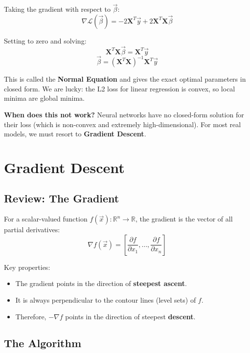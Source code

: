 \documentclass[12pt]{article}
\begin{document}
Taking the gradient with respect to $\vec{\beta}$:
\[
\nabla\mathcal{L}(\vec{\beta}) = -2\boldsymbol{X}^T\vec{y} + 2\boldsymbol{X}^T\boldsymbol{X}\vec{\beta}
\]

Setting to zero and solving:
\[
\boldsymbol{X}^T\boldsymbol{X}\vec{\beta} = \boldsymbol{X}^T\vec{y}
\]
\[
\boxed{\vec{\beta} = (\boldsymbol{X}^T\boldsymbol{X})^{-1}\boldsymbol{X}^T\vec{y}}
\]

This is called the \textbf{Normal Equation} and gives the exact optimal parameters in closed form. We are lucky: the L2 loss for linear regression is convex, so local minima are global minima.

\begin{notebox}
\textbf{When does this not work?} Neural networks have no closed-form solution for their loss (which is non-convex and extremely high-dimensional). For most real models, we must resort to \textbf{Gradient Descent}.
\end{notebox}

\section{Gradient Descent}

\subsection{Review: The Gradient}

For a scalar-valued function $f(\vec{x}) : \mathbb{R}^n \to \mathbb{R}$, the gradient is the vector of all partial derivatives:
\[
\nabla f(\vec{x}) = \left[\frac{\partial f}{\partial x_1}, \ldots, \frac{\partial f}{\partial x_n}\right]
\]

Key properties:
\begin{itemize}
  \item The gradient points in the direction of \textbf{steepest ascent}.
  \item It is always perpendicular to the contour lines (level sets) of $f$.
  \item Therefore, $-\nabla f$ points in the direction of steepest \textbf{descent}.
\end{itemize}

\subsection{The Algorithm}
\end{document}
